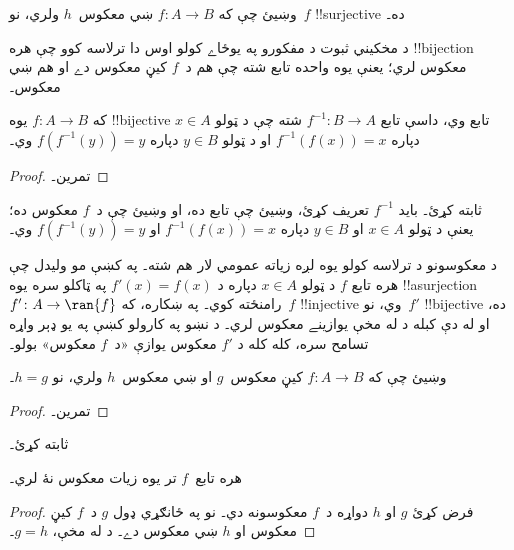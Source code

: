 \documentclass[../../../include/open-logic-section]{subfiles}
\begin{document}
\begin{prob}
وښيئ چې که $f\colon A \to B$ ښي معکوس~$h$ ولري، نو~$f$
!!{surjective} ده۔
\end{prob}

\begin{explain}
  د مخکيني ثبوت د مفکورو په يوځاے کولو اوس دا ترلاسه کوو چې
  هره !!{bijection} معکوس لري؛ يعنې يوه واحده تابع شته چې
  هم د~$f$ کيڼ معکوس دے او هم ښي معکوس۔
\end{explain}

\begin{prop}
که $f\colon A \to B$ يوه !!{bijective} تابع وي، داسې تابع
$f^{-1}\colon B \to A$ شته چې د ټولو $x \in A$ دپاره
$f^{-1}(f(x)) = x$ او د ټولو $y \in B$ دپاره $f(f^{-1}(y)) = y$ وي۔
\end{prop}

\begin{proof}
تمرين۔
\end{proof}

\begin{prob}
 ثابته کړئ۔ بايد
$f^{-1}$ تعريف کړئ، وښيئ چې تابع ده، او وښيئ چې د~$f$ معکوس
ده؛ يعنې د ټولو $x \in A$ او $y \in B$ دپاره $f^{-1}(f(x)) = x$
او $f(f^{-1}(y)) = y$ وي۔
\end{prob}

\begin{explain}
د معکوسونو د ترلاسه کولو يوه لږه زياته عمومي لار هم شته۔ په
 کښې مو وليدل چې هره تابع $f$ د ټولو $x \in A$
دپاره د $f'(x) = f(x)$ په ټاکلو سره يوه !!a{surjection}
$f' \colon A \to \ran{f}$ رامنځته کوي۔ په ښکاره، که~$f$
!!{injective} وي، نو~$f'$ !!{bijective} ده، او له دې کبله د
 له مخې يوازينے معکوس لري۔ د نښو
په کارولو کښې په يو ډېر واړه تسامح سره، کله کله د $f'$ معکوس
يوازې «د~$f$ معکوس» بولو۔
\end{explain}

\begin{prop}%
  وښيئ چې که $f\colon A \to B$ کيڼ معکوس~$g$ او ښي معکوس~$h$
  ولري، نو $h = g$۔
\end{prop}

\begin{proof}
  تمرين۔
\end{proof}

\begin{prob}
   ثابته کړئ۔
\end{prob}

\begin{prop}
هره تابع~$f$ تر يوه زيات معکوس نۀ لري۔
\end{prop}

\begin{proof}
  فرض کړئ $g$ او $h$ دواړه د~$f$ معکوسونه دي۔ نو په ځانګړي ډول
  $g$ د~$f$ کيڼ معکوس او $h$ ښي معکوس دے۔ د
   له مخې، $g = h$۔
\end{proof}
\end{document}
